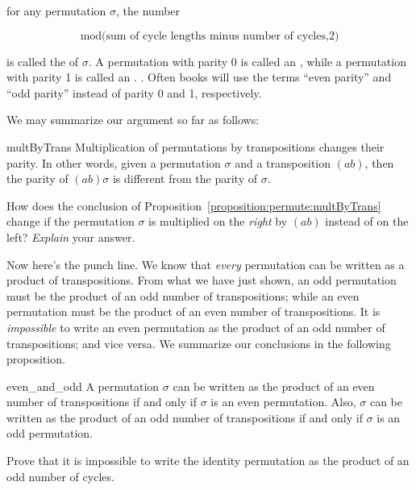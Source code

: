\begin{defn} for any permutation $\sigma$, the number 

\[ \text{mod(sum of cycle lengths minus number of cycles,2)} \]

\noindent
is called the  of $\sigma$. A permutation with parity 0 is called an , while a  permutation with parity 1 is called an . .  Often books will use the terms ``even parity'' and ``odd parity''  instead of parity 0 and 1, respectively.
\end{defn}

We may  summarize our argument so far as follows:

\begin{prop}{multByTrans}
Multiplication of permutations by transpositions changes their parity. In other words, given a permutation $\sigma$ and a transposition $(ab)$, then the parity of $(ab)\sigma$ is different from the parity of $\sigma$.
\end{prop}

\begin{exercise}{}
How does the conclusion of Proposition~\ref{proposition:permute:multByTrans} change if the permutation $\sigma$ is multiplied on the \emph{right} by $(ab)$ instead of on the left?  \emph{Explain} your answer.
\end{exercise}

Now here's the punch line. We know that \emph{every} permutation can be written as a product of transpositions. 
From what we have just shown, an odd permutation must be the product of an odd number of transpositions; while an even permutation must be the product of an even number of transpositions. It is \emph{impossible} to write an even permutation as the product of an odd number of transpositions; and vice versa. 
We summarize our conclusions in the following proposition.

\begin{prop}{even_and_odd}
A permutation $\sigma$ can be written as the product of an even number of transpositions if and only if $\sigma$ is an even permutation. 
Also, $\sigma$ can be written as the product of an odd number of transpositions if and only if $\sigma$ is an odd permutation. 
\end{prop}


\begin{exercise}{}
Prove that it is impossible to write the identity permutation as the product of an odd number of cycles.
\end{exercise}



